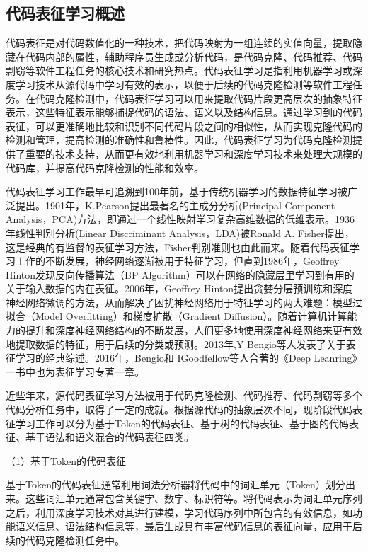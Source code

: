 \subsection{代码表征学习概述}

代码表征是对代码数值化的一种技术，把代码映射为一组连续的实值向量，提取隐藏在代码内部的属性，辅助程序员生成或分析代码，是代码克隆、代码推荐、代码剽窃等软件工程任务的核心技术和研究热点\cite{谢春丽_53}。代码表征学习是指利用机器学习或深度学习技术从源代码中学习有效的表示，以便于后续的代码克隆检测等软件工程任务。在代码克隆检测中，代码表征学习可以用来提取代码片段更高层次的抽象特征表示，这些特征表示能够捕捉代码的语法、语义以及结构信息。通过学习到的代码表征，可以更准确地比较和识别不同代码片段之间的相似性，从而实现克隆代码的检测和管理，提高检测的准确性和鲁棒性。因此，代码表征学习为代码克隆检测提供了重要的技术支持，从而更有效地利用机器学习和深度学习技术来处理大规模的代码库，并提高代码克隆检测的性能和效率。

代码表征学习工作最早可追溯到100年前，基于传统机器学习的数据特征学习被广泛提出。1901年，K.Pearson提出最著名的主成分分析(Principal Component Analysis，PCA)方法\cite{WOS:000202849800065}，即通过一个线性映射学习复杂高维数据的低维表示。1936年线性判别分析(Linear Discriminant Analysis，LDA)被Ronald A. Fisher提出\cite{2012THE}，这是经典的有监督的表征学习方法，Fisher判别准则也由此而来。随着代码表征学习工作的不断发展，神经网络逐渐被用于特征学习，但直到1986年，Geoffrey Hinton\cite{1986Learning}发现反向传播算法（BP Algorithm）可以在网络的隐藏层里学习到有用的关于输入数据的内在表征。2006年，Geoffrey Hinton提出贪婪分层预训练和深度神经网络微调\cite{2006A}的方法，从而解决了困扰神经网络用于特征学习的两大难题：模型过拟合（Model Overfitting）和梯度扩散（Gradient Diffusion）。随着计算机计算能力的提升和深度神经网络结构的不断发展，人们更多地使用深度神经网络来更有效地提取数据的特征，用于后续的分类或预测。2013年,Y Bengio等人发表了关于表征学习的经典综述\cite{Bengio2013Representation}。2016年，Bengio和 IGoodfellow等人合著的《Deep Leanring》一书中也为表征学习专著一章\cite{goodfellow2016deep}。

近些年来，源代码表征学习方法被用于代码克隆检测、代码推荐、代码剽窃等多个代码分析任务中，取得了一定的成就。根据源代码的抽象层次不同，现阶段代码表征学习工作可以分为基于Token的代码表征、基于树的代码表征、基于图的代码表征、基于语法和语义混合的代码表征四类。

（1）基于Token的代码表征

基于Token的代码表征通常利用词法分析器将代码中的词汇单元（Token）划分出来。这些词汇单元通常包含关键字、数字、标识符等。将代码表示为词汇单元序列之后，利用深度学习技术对其进行建模，学习代码序列中所包含的有效信息，如功能语义信息、语法结构信息等，最后生成具有丰富代码信息的表征向量，应用于后续的代码克隆检测任务中。

